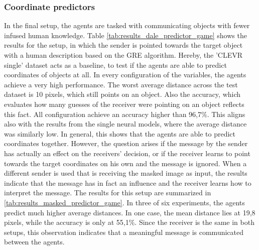 \subsubsection{Coordinate predictors}
In the final setup, the agents are tasked with communicating objects with fewer infused human knowledge.
Table \ref{tab:results_dale_predictor_game} shows the results for the setup, in which the sender is pointed towards the target object with a human description based on the GRE algorithm.
Hereby, the 'CLEVR single' dataset acts as a baseline, to test if the agents are able to predict coordinates of objects at all.
In every configuration of the variables, the agents achieve a very high performance.
The worst average distance across the test dataset is 10 pixels, which still points on an object.
Also the accuracy, which evaluates how many guesses of the receiver were pointing on an object reflects this fact.
All configuration achieve an accuracy higher than 96,7\%.
This aligns also with the results from the single neural models, where the average distance was similarly low.
In general, this shows that the agents are able to predict coordinates together.
However, the question arises if the message by the sender has actually an effect on the receivers' decision, or if the receiver learns to point towards the target coordinates on his own and the message is ignored.
When a different sender is used that is receiving the masked image as input, the results indicate that the message has in fact an influence and the receiver learns how to interpret the message.
The results for this setup are summarized in \ref{tab:results_masked_predictor_game}.
In three of six experiments, the agents predict much higher average distances.
In one case, the mean distance lies at 19,8 pixels, while the accuracy is only at 55,1\%.
Since the receiver is the same in both setups, this observation indicates that a meaningful message is communicated between the agents.

